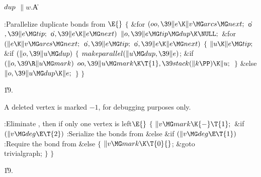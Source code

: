 \B\D$\\{dup}$ \5
$\|w.{}$\|A\par
\Y\B\4:Parallelize duplicate bonds from \X${}\E{}$\6
${}\{{}$\1\6
\&{for} ${}(\\{oo},\39\|e\K\|v\MG\\{arcs}\MG\\{next};{}$ \|o${},\39\|e\MG%
\\{tip};{}$ \|o${},\39\|e\K\|e\MG\\{next}){}$\1\5
${}\|o,\39\|e\MG\\{tip}\MG\\{dup}\K\NULL;{}$\2\6
\&{for} ${}(\|e\K\|v\MG\\{arcs}\MG\\{next};{}$ \|o${},\39\|e\MG\\{tip};{}$ %
\|o${},\39\|e\K\|e\MG\\{next}){}$\5
${}\{{}$\1\6
${}\|u\K\|e\MG\\{tip};{}$\6
\&{if} ${}(\|o,\39\|u\MG\\{dup}){}$\5
${}\{{}$\1\6
${}\\{makeparallel}(\|u\MG\\{dup},\39\|e){}$;\6
\&{if} ${}(\|o,\39\R\|u\MG\\{mark}){}$\1\5
${}\\{oo},\39\|u\MG\\{mark}\K\T{1},\39\\{stack}(\|k\PP)\K\|u;{}$\2\6
\4${}\}{}$\5
\2\&{else}\1\5
${}\|o,\39\|u\MG\\{dup}\K\|e;{}$\2\6
\4${}\}{}$\2\6
\4${}\}{}$\2\par
\U19.\fi

A deleted vertex is marked $-1$, for debugging purposes only.

\Y\B\4:Eliminate , then  if only one
vertex is left\X${}\E{}$\6
${}\{{}$\1\6
${}\|v\MG\\{mark}\K{-}\T{1};{}$\6
\&{if} ${}(\|v\MG\\{deg}\E\T{2}){}$\1\5
:Serialize the bonds from \X\2\6
\&{else} \&{if} ${}(\|v\MG\\{deg}\E\T{1}){}$\1\5
:Require the bond from \X\2\6
\&{else}\5
${}\{{}$\1\6
${}\|v\MG\\{mark}\K\T{0}{}$;\6
\&{goto} \\{trivialgraph};\6
\4${}\}{}$\2\6
\4${}\}{}$\2\par
\U19.\fi

